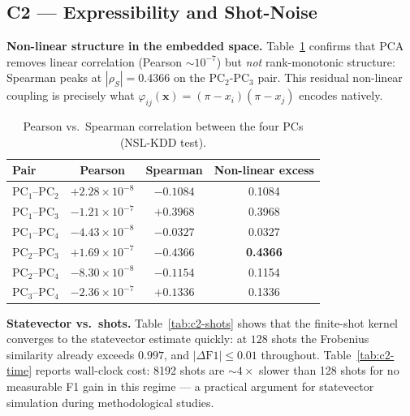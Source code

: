 \documentclass[journal]{IEEEtran}
\begin{document}
  \subsection{C2 --- Expressibility and Shot-Noise}
  \textbf{Non-linear structure in the embedded space.}
  Table~\ref{tab:c2-spearman} confirms that PCA removes linear
  correlation (Pearson $\sim 10^{-7}$) but \emph{not} rank-monotonic
  structure: Spearman peaks at $|\rho_S|{=}0.4366$ on the PC$_2$-PC$_3$
  pair. This residual non-linear coupling is precisely what
  $\varphi_{ij}(\mathbf{x})=(\pi-x_i)(\pi-x_j)$ encodes natively.

  \begin{table}[t]
  \centering
  \caption{Pearson vs.\ Spearman correlation between the four PCs
    (NSL-KDD test).}
  \label{tab:c2-spearman}
  \small
  \begin{tabular}{lccc}
  \toprule
  Pair & Pearson & Spearman & Non-linear excess\\\midrule
  PC$_1$--PC$_2$ & $+2.28\!\times\!10^{-8}$ & $-0.1084$ & 0.1084\\
  PC$_1$--PC$_3$ & $-1.21\!\times\!10^{-7}$ & $+0.3968$ & 0.3968\\
  PC$_1$--PC$_4$ & $-4.43\!\times\!10^{-8}$ & $-0.0327$ & 0.0327\\
  PC$_2$--PC$_3$ & $+1.69\!\times\!10^{-7}$ & $\mathbf{-0.4366}$ & \textbf{0.4366}\\
  PC$_2$--PC$_4$ & $-8.30\!\times\!10^{-8}$ & $-0.1154$ & 0.1154\\
  PC$_3$--PC$_4$ & $-2.36\!\times\!10^{-7}$ & $+0.1336$ & 0.1336\\
  \bottomrule
  \end{tabular}
  \end{table}

  \textbf{Statevector vs.\ shots.} Table~\ref{tab:c2-shots} shows
  that the finite-shot kernel converges to the statevector estimate
  quickly: at $128$ shots the Frobenius similarity already exceeds
  $0.997$, and $|\Delta\mathrm{F1}|\le 0.01$ throughout.
  Table~\ref{tab:c2-time} reports wall-clock cost: 8192 shots are
  $\sim 4{\times}$ slower than 128 shots for no measurable F1 gain in
  this regime --- a practical argument for statevector simulation
  during methodological studies.
\end{document}
